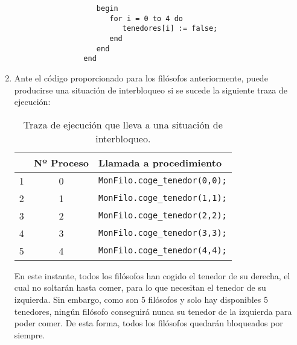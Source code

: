 \begin{ejercicio}
\begin{enumerate}
\begin{verbatim}
                   begin
                      for i = 0 to 4 do 
                         tenedores[i] := false;
                      end
                   end
                end
            \end{verbatim}
        \item Ante el código proporcionado para los filósofos anteriormente, puede producirse una situación de interbloqueo si se sucede la siguiente traza de ejecución:
            \begin{table}[H]
            \centering
            \begin{tabular}{|c|c|l|}
                \hline
                 & Nº Proceso & Llamada a procedimiento \\
                \hline
                1 & 0 & \verb|MonFilo.coge_tenedor(0,0);| \\
                \hline
                2 & 1 & \verb|MonFilo.coge_tenedor(1,1);| \\
                \hline
                3 & 2 & \verb|MonFilo.coge_tenedor(2,2);| \\
                \hline
                4 & 3 & \verb|MonFilo.coge_tenedor(3,3);| \\
                \hline
                5 & 4 & \verb|MonFilo.coge_tenedor(4,4);| \\
                \hline
            \end{tabular}
            \caption{Traza de ejecución que lleva a una situación de interbloqueo.}
            \label{etiqueta}
            \end{table}
            En este instante, todos los filósofos han cogido el tenedor de su derecha, el cual no soltarán hasta comer, para lo que necesitan el tenedor de su izquierda. Sin embargo, como son 5 filósofos y solo hay disponibles 5 tenedores, ningún filósofo conseguirá nunca su tenedor de la izquierda para poder comer. De esta forma, todos los filósofos quedarán bloqueados por siempre.
    \end{enumerate}
\end{ejercicio}







